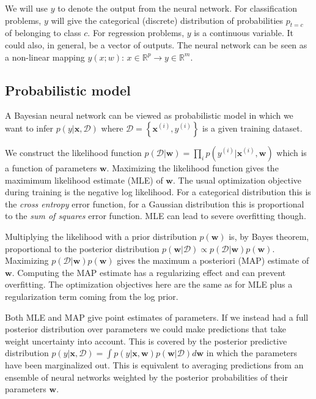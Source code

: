 \documentclass[%
oneside,                 %
final,                   %
10pt]{article}
\newenvironment{notice_mdfboxadmon}[1][]{
\begin{notice_mdfboxmdframed}[frametitle=#1]
}
{
\end{notice_mdfboxmdframed}
}
\begin{document}
\noindent

\begin{notice_mdfboxadmon}[Notice]
We will use $y$ to denote the output from the neural network. For classification problems, $y$ will give the categorical (discrete) distribution of probabilities $p_{t=c}$ of belonging to class $c$. For regression problems, $y$ is a continuous variable. It could also, in general, be a vector of outputs. The neural network can be seen as a non-linear mapping $y(x; w)$: $x \in \mathbb{R}^p \to y \in \mathbb{R}^m$.
\end{notice_mdfboxadmon} %



\subsection{Probabilistic model}

A Bayesian neural network can be viewed as probabilistic model in which we want to infer $p(y \lvert \boldsymbol{x},\mathcal{D})$ where $\mathcal{D} = \left\{\boldsymbol{x}^{(i)}, y^{(i)}\right\}$ is a given training dataset. 

We construct the likelihood function $p(\mathcal{D} \lvert \boldsymbol{w}) = \prod_i p(y^{(i)} \lvert \boldsymbol{x}^{(i)}, \boldsymbol{w})$ which is a function of parameters $\boldsymbol{w}$. Maximizing the likelihood function gives the maximimum likelihood estimate (MLE) of $\boldsymbol{w}$. The usual optimization objective during training is the negative log likelihood. For a categorical distribution this is the \emph{cross entropy} error function, for a Gaussian distribution this is proportional to the \emph{sum of squares} error function. MLE can lead to severe overfitting though.

Multiplying the likelihood with a prior distribution $p(\boldsymbol{w})$ is, by Bayes theorem, proportional to the posterior distribution $p(\boldsymbol{w} \lvert \mathcal{D}) \propto p(\mathcal{D} \lvert \boldsymbol{w}) p(\boldsymbol{w})$. Maximizing $p(\mathcal{D} \lvert \boldsymbol{w}) p(\boldsymbol{w})$ gives the maximum a posteriori (MAP) estimate of $\boldsymbol{w}$. Computing the MAP estimate has a regularizing effect and can prevent overfitting. The optimization objectives here are the same as for MLE plus a regularization term coming from the log prior.

Both MLE and MAP give point estimates of parameters. If we instead had a full posterior distribution over parameters we could make predictions that take weight uncertainty into account. This is covered by the posterior predictive distribution $p(y \lvert \boldsymbol{x},\mathcal{D}) = \int p(y \lvert \boldsymbol{x}, \boldsymbol{w}) p(\boldsymbol{w} \lvert \mathcal{D}) d\boldsymbol{w}$ in which the parameters have been marginalized out. This is equivalent to averaging predictions from an ensemble of neural networks weighted by the posterior probabilities of their parameters $\boldsymbol{w}$.
\end{document}
